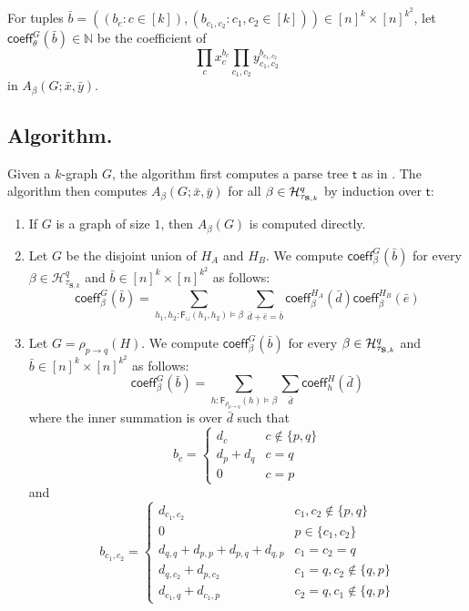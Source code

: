 \documentclass{llncs}
\newcommand{\coeff}{\mathsf{coeff}}
\renewcommand{\mp}{\mathsf{F}}
\begin{document}
For tuples $\bar{b}=\left((b_{c}:c\in[k]),(b_{c_{1},c_{2}}:c_{1},c_{2}\in[k])\right)\in[n]^{k}\times[n]^{k^2}$,
let $\coeff_{\theta}^{G}(\bar{b})\in\mathbb{N}$ be the coefficient
of 
\[
\prod_{c}x_{c}^{b_{c}}\prod_{c_{1},c_{2}}y_{c_{1},c_{2}}^{b_{c_{1},c_{2}}}
\]
in $A_{\beta}(G;\bar{x},\bar{y})$.

\subsection*{Algorithm.}

Given a $k$-graph $G$, the algorithm first computes a parse tree
$\mathsf{t}$ as in \cite{ar:Oum2005,ar:SeymourOum2006}. The algorithm
then computes $A_{\beta}(G;\bar{x},\bar{y})$ for all $\beta\in\mathcal{H}_{\tau_{{\bf S},k}}^{q}$
by induction over $\mathsf{t}$:
\begin{enumerate}
\item If $G$ is a graph of size $1$, then $A_{\beta}(G)$ is computed
directly. 
\item Let $G$ be the disjoint union of $H_{A}$ and $H_{B}$. We compute
$\coeff_{\beta}^{G}(\bar{b})$ for every $\beta\in\mathcal{H}_{\tau_{\mathbf{S},k}}^{q}$
and $\bar{b}\in[n]^{k}\times[n]^{k^2}$ as follows: 
\[
\coeff_{\beta}^{G}(\bar{b})=
\sum_{h_{1},h_{2}:\mp_{\sqcup}(h_{1},h_{2})\models\beta}\sum_{\bar{d}+\bar{e}=\bar{b}}\coeff_{\beta}^{H_{A}}(\bar{d})\coeff_{\beta}^{H_{B}}(\bar{e})
\]
 
\item Let $G=\rho_{p\to q}(H)$. We compute $\coeff_{\beta}^{G}(\bar{b})$
for every $\beta\in\mathcal{H}_{\tau_{{\bf S},k}}^{q}$ and $\bar{b}\in[n]^{k}\times[n]^{k^2}$
as follows: 
\[
\coeff_{\beta}^{G}(\bar{b})=\sum_{h:\mp_{\rho_{p\to q}}(h)\models\beta}\sum_{\bar{d}}\coeff_{h}^{H}(\bar{d})
\]
where the inner summation is over $\bar{d}$ such that 
\[
b_{c}=\begin{cases}
d_{c} & c\notin\{p,q\}\\
d_{p}+d_{q} & c=q\\
0 & c=p
\end{cases}
\]
and 
\[
b_{c_{1},c_{2}}=\begin{cases}
d_{c_{1},c_{2}} & c_{1},c_{2}\notin\{p,q\}\\
0 & p\in\{c_{1},c_{2}\}\\
d_{q,q}+d_{p,p}+d_{p,q}+d_{q,p} & c_{1}=c_{2}=q\\
d_{q,c_{2}}+d_{p,c_{2}} & c_{1}=q,c_{2}\not\in\{q,p\}\\
d_{c_{1},q}+d_{c_{1},p} & c_{2}=q,c_{1}\not\in\{q,p\}
\end{cases}
\]


\end{enumerate}
\end{document}
